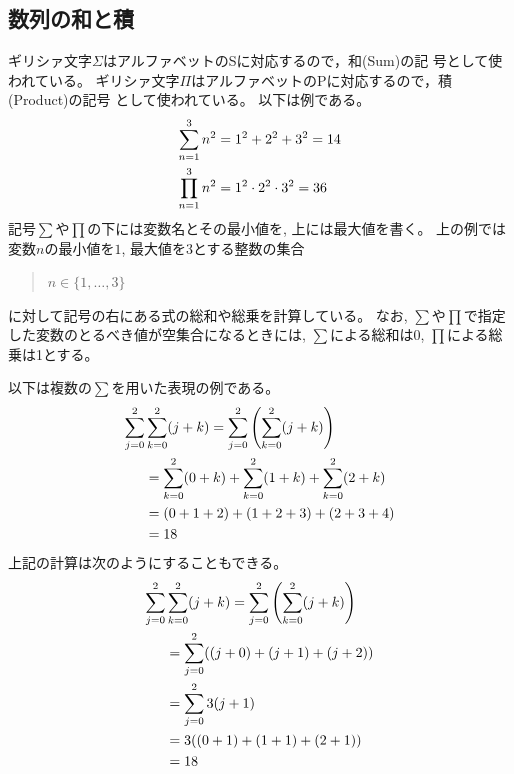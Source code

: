 \documentclass[twocolumn,11pt]{jarticle}
\begin{document}

\subsection{数列の和と積}
ギリシァ文字$\Sigma$はアルファベットのSに対応するので，和(Sum)の記
号として使われている\index{$\sum$}。
ギリシァ文字$\Pi$はアルファベットのPに対応するので，積(Product)の記号
として使われている\index{$\prod$}。
以下は例である。
\begin{align}
 \sum_{n=1}^3n^2&=1^2+2^2+3^2=14\notag\\
 \prod_{n=1}^3n^2&=1^2\cdot 2^2\cdot 3^2=36\notag
\end{align}
記号$\sum$や$\prod$の下には変数名とその最小値を, 上には最大値を書く。
上の例では変数$n$の最小値を$1$, 最大値を$3$とする整数の集合
\begin{quote}
  $n\in\{1,\ldots,3\}$
\end{quote}
に対して記号の右にある式の総和や総乗を計算している。
なお, $\sum$や$\prod$で指定した変数のとるべき値が空集合になるときには,
$\sum$による総和は0, $\prod$による総乗は1とする。

以下は複数の$\sum$を用いた表現の例である。
\begin{align}
 \sum_{j=0}^2&\sum_{k=0}^2(j+k)=\sum_{j=0}^2\left(\sum_{k=0}^2(j+k)\right)\notag\\
 &=\sum_{k=0}^2(0+k)+\sum_{k=0}^2(1+k)+\sum_{k=0}^2(2+k)\notag\\
 &=(0+1+2)+(1+2+3)+(2+3+4)\notag\\
 &=18\notag
\end{align}
上記の計算は次のようにすることもできる。
\begin{align}
 \sum_{j=0}^2&\sum_{k=0}^2(j+k)=\sum_{j=0}^2\left(\sum_{k=0}^2(j+k)\right)\notag\\
 &=\sum_{j=0}^2((j+0)+(j+1)+(j+2))\notag\\
 &=\sum_{j=0}^23(j+1)\notag\\
 &=3((0+1)+(1+1)+(2+1))\notag\\
 &=18\notag
\end{align}
\end{document}
